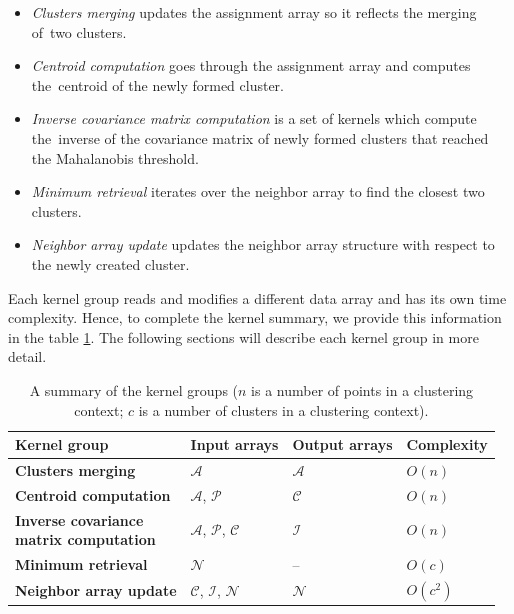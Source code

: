 \begin{itemize}
	\item \emph{Clusters merging} updates the assignment array so it reflects the merging of~two clusters.
	\item \emph{Centroid computation} goes through the assignment array and computes the~centroid of the newly formed cluster. 
	\item \emph{Inverse covariance matrix computation} is a set of kernels which compute the~inverse of the covariance matrix of newly formed clusters that reached the Mahalanobis threshold. 
	\item \emph{Minimum retrieval} iterates over the neighbor array to find the closest two clusters.
	\item \emph{Neighbor array update} updates the neighbor array structure with respect to the newly created cluster.
\end{itemize}

Each kernel group reads and modifies a different data array and has its own time complexity. Hence, to complete the kernel summary, we provide this information in the table \ref{tab03:kernels}. The following sections will describe each kernel group in more detail.

 \begin{table}
 	\centering
	\renewcommand{\arraystretch}{1.5}
 	\begin{tabular}{llll}
 		\toprule
 		\textbf{Kernel group}                  & {\textbf{Input arrays}} & \textbf{Output arrays}  & \textbf{Complexity} \\ \midrule
 		\textbf{Clusters merging}              &     $\mathcal{A}$       &     $\mathcal{A}$      &       $O(n)$        \\
 		\textbf{Centroid computation}          &     $\mathcal{A}$, $\mathcal{P}$       &  $\mathcal{C}$  &   $O(n)$\\
 		\parbox{10em}{\textbf{Inverse covariance\\ matrix computation}}            &  $\mathcal{A}$, $\mathcal{P}$, $\mathcal{C}$        &     $\mathcal{I}$                 &       $O(n)$ \\
 		\textbf{Minimum retrieval}             &     $\mathcal{N}$         & --     &       $O(c)$        \\
 		\textbf{Neighbor array update}         &    $\mathcal{C}$,    $\mathcal{I}$, $\mathcal{N}$        &     $\mathcal{N}$      &      $O(c^2)$       \\ \bottomrule
 	\end{tabular}
 	\caption{A summary of the kernel groups ($n$ is a number of points in a clustering context; $c$ is a number of clusters in a clustering context).}
 	\label{tab03:kernels}
 \end{table}

